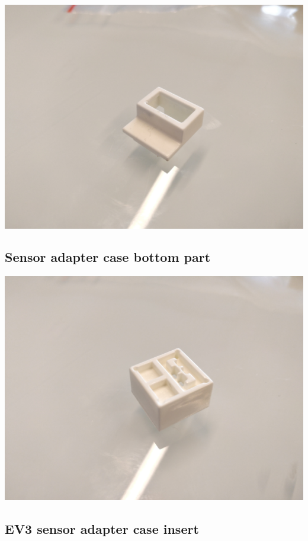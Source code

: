 \documentclass[a4paper,12pt]{article}
\begin{document}
\includegraphics[width=13.5cm]{sensor-plastic-top.jpg}

\subsection{Sensor adapter case bottom part}

\includegraphics[width=13.5cm]{sensor-plastic-bottom.jpg}

\subsection{EV3 sensor adapter case insert}
\end{document}
